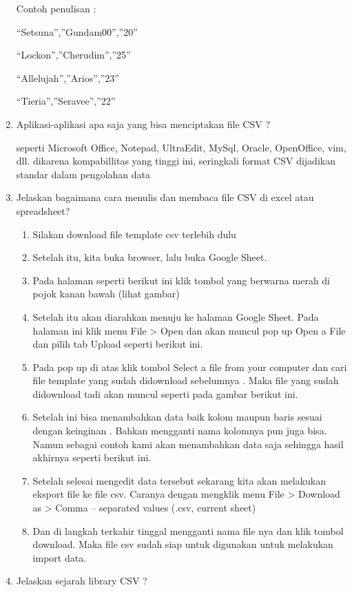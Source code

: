\begin{enumerate}
Contoh penulisan :

“Setsuna”,”Gundam00”,”20”

“Lockon”,”Cherudim”,”25”

“Allelujah”,”Arios”,”23”

“Tieria”,”Seravee”,”22”

\item Aplikasi-aplikasi apa saja yang bisa menciptakan file CSV ?

seperti Microsoft Office, Notepad, UltraEdit, MySql, Oracle, OpenOffice, vim, dll. dikarena kompabillitas yang tinggi ini, seringkali format CSV dijadikan standar dalam pengolahan data

\item Jelaskan bagaimana cara menulis dan membaca file CSV di excel atau spreadsheet?
	\begin{enumerate}
	\item Silakan download file template csv terlebih dulu
	\item Setelah itu, kita buka browser, lalu buka Google Sheet.
	\item Pada halaman seperti berikut ini klik tombol yang berwarna merah di pojok kanan bawah (lihat gambar)
	\item Setelah itu  akan diarahkan menuju ke halaman Google Sheet. Pada halaman ini klik menu File > Open dan akan muncul pop up Open a File dan pilih tab Upload seperti berikut ini.
	\item Pada pop up di atas klik tombol Select a file from your computer dan cari file template yang sudah didownload sebelumnya . Maka file yang sudah didownload tadi akan muncul seperti pada gambar berikut ini.
	\item Setelah ini  bisa menambahkan data baik kolom maupun baris sesuai dengan keinginan . Bahkan mengganti nama kolomnya pun juga bisa. Namun sebagai contoh kami akan menambahkan data saja sehingga hasil akhirnya seperti berikut ini.
	\item Setelah selesai mengedit data tersebut sekarang kita akan melakukan eksport file ke file csv. Caranya dengan mengklik menu File > Download as > Comma – separated values (.csv, current sheet)
	\item Dan di langkah terkahir tinggal mengganti nama file nya dan klik tombol download. Maka file csv sudah siap untuk digunakan untuk melakukan import data.

	\end{enumerate}


\item Jelaskan sejarah library CSV ?



\end{enumerate}
